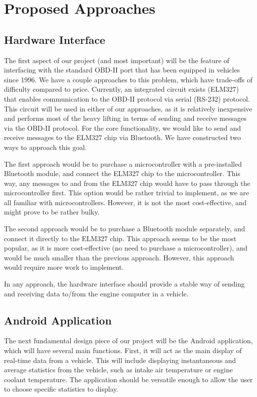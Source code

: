 \documentclass[12pt]{article}
\begin{document}
\section{Proposed Approaches}\label{sec:ProposedApproaches}

\subsection{Hardware Interface}\label{subsec:HardwareInterface}
The first aspect of our project (and most important) will be the feature of interfacing with the standard OBD-II port that has been equipped in vehicles since 1996.  We have a couple approaches to this problem, which have trade-offs of difficulty compared to price.
Currently, an integrated circuit exists (ELM327) that enables communication to the OBD-II protocol via serial (RS-232) protocol.  This circuit will be used in either of our approaches, as it is relatively inexpensive and performs most of the heavy lifting in terms of sending and receive messages via the OBD-II protocol.  For the core functionality, we would like to send and receive messages to the ELM327 chip via Bluetooth.  We have constructed two ways to approach this goal. 

The first approach would be to purchase a microcontroller with a pre-installed Bluetooth module, and connect the ELM327 chip to the microcontroller.  This way, any messages to and from the ELM327 chip would have to pass through the microcontroller first.  This option would be rather trivial to implement, as we are all familiar with microcontrollers.  However, it is not the most cost-effective, and might prove to be rather bulky.

The second approach would be to purchase a Bluetooth module separately, and connect it directly to the ELM327 chip.  This approach seems to be the most popular, as it is more cost-effective (no need to purchase a microcontroller), and would be much smaller than the previous approach.  However, this approach would require more work to implement.

In any approach, the hardware interface should provide a stable way of sending and receiving data to/from the engine computer in a vehicle.

\subsection{Android Application}\label{subsec:AndroidApplication}

The next fundamental design piece of our project will be the Android application, which will have several main functions.  First, it will act as the main display of real-time data from a vehicle.  This will include displaying instantaneous and average statistics from the vehicle, such as intake air temperature or engine coolant temperature.  The application should be versatile enough to allow the user to choose specific statistics to display.
\end{document}

